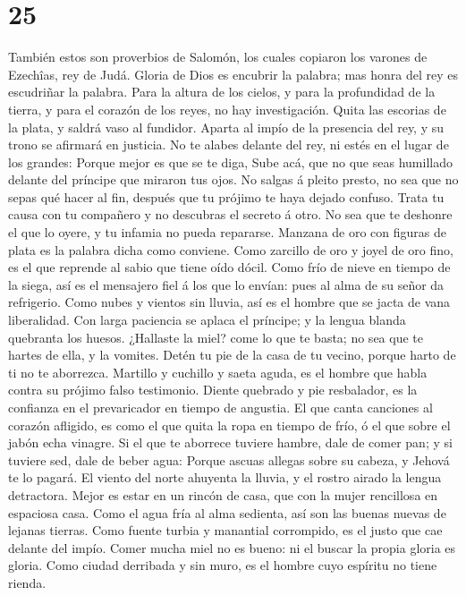 \hypertarget{section-24}{%
\section{25}\label{section-24}}

 También estos son proverbios de Salomón, los cuales
copiaron los varones de Ezechîas, rey de Judá.  Gloria de
Dios es encubrir la palabra; mas honra del rey es escudriñar la palabra.
 Para la altura de los cielos, y para la profundidad de la
tierra, y para el corazón de los reyes, no hay investigación.
 Quita las escorias de la plata, y saldrá vaso al fundidor.
 Aparta al impío de la presencia del rey, y su trono se
afirmará en justicia.  No te alabes delante del rey, ni
estés en el lugar de los grandes:  Porque mejor es que se te
diga, Sube acá, que no que seas humillado delante del príncipe que
miraron tus ojos.  No salgas á pleito presto, no sea que no
sepas qué hacer al fin, después que tu prójimo te haya dejado confuso.
 Trata tu causa con tu compañero y no descubras el secreto á
otro.  No sea que te deshonre el que lo oyere, y tu infamia
no pueda repararse.  Manzana de oro con figuras de plata es
la palabra dicha como conviene.  Como zarcillo de oro y
joyel de oro fino, es el que reprende al sabio que tiene oído dócil.
 Como frío de nieve en tiempo de la siega, así es el
mensajero fiel á los que lo envían: pues al alma de su señor da
refrigerio.  Como nubes y vientos sin lluvia, así es el
hombre que se jacta de vana liberalidad.  Con larga
paciencia se aplaca el príncipe; y la lengua blanda quebranta los
huesos.  ¿Hallaste la miel? come lo que te basta; no sea
que te hartes de ella, y la vomites.  Detén tu pie de la
casa de tu vecino, porque harto de ti no te aborrezca. 
Martillo y cuchillo y saeta aguda, es el hombre que habla contra su
prójimo falso testimonio.  Diente quebrado y pie
resbalador, es la confianza en el prevaricador en tiempo de angustia.
 El que canta canciones al corazón afligido, es como el que
quita la ropa en tiempo de frío, ó el que sobre el jabón echa vinagre.
 Si el que te aborrece tuviere hambre, dale de comer pan; y
si tuviere sed, dale de beber agua:  Porque ascuas allegas
sobre su cabeza, y Jehová te lo pagará.  El viento del
norte ahuyenta la lluvia, y el rostro airado la lengua detractora.
 Mejor es estar en un rincón de casa, que con la mujer
rencillosa en espaciosa casa.  Como el agua fría al alma
sedienta, así son las buenas nuevas de lejanas tierras. 
Como fuente turbia y manantial corrompido, es el justo que cae delante
del impío.  Comer mucha miel no es bueno: ni el buscar la
propia gloria es gloria.  Como ciudad derribada y sin muro,
es el hombre cuyo espíritu no tiene rienda.

